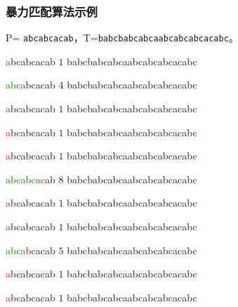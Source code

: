 \documentclass{ctexbeamer}
\newcommand{\red}[1]{\textcolor{red}{#1}}
\newcommand{\green}[1]{\textcolor{green}{#1}}
\begin{document}
\begin{frame}[fragile]
\frametitle{暴力匹配算法示例}
P= \texttt{abcabcacab}，T=\texttt{babcbabcabcaabcabcabcacabc}。

\begin{minipage}[t]{0.5\textwidth}
	\begin{tverb}
\red{a}bcabcacab \(1\)
babcbabcabcaabcabcabcacabc
	\end{tverb}

	\begin{tverb}
 \green{abc}\red{a}bcacab \(4\)
babcbabcabcaabcabcabcacabc
	\end{tverb}


	\begin{tverb}
  \red{a}bcabcacab \(1\)
babcbabcabcaabcabcabcacabc
	\end{tverb}

	\begin{tverb}
   \red{a}bcabcacab \(1\)
babcbabcabcaabcabcabcacabc
	\end{tverb}

	\begin{tverb}
    \red{a}bcabcacab \(1\)
babcbabcabcaabcabcabcacabc
	\end{tverb}

	\begin{tverb}
     \green{abcabca}\red{c}ab \(8\)
babcbabcabcaabcabcabcacabc
	\end{tverb}

	\begin{tverb}
      \red{a}bcabcacab \(1\)
babcbabcabcaabcabcabcacabc
	\end{tverb}

	\begin{tverb}
       \red{a}bcabcacab \(1\)
babcbabcabcaabcabcabcacabc
	\end{tverb}

	\begin{tverb}
        \green{abca}\red{b}cacab \(5\)
babcbabcabcaabcabcabcacabc
	\end{tverb}

\end{minipage}%
\begin{minipage}[t]{.5\textwidth}

\begin{tverb}
         \red{a}bcabcacab \(1\)
babcbabcabcaabcabcabcacabc
	\end{tverb}

\begin{tverb}
          \red{a}bcabcacab \(1\)
babcbabcabcaabcabcabcacabc
	\end{tverb}


\end{minipage}
\end{frame}
\end{document}
